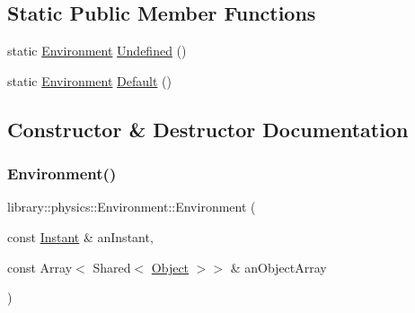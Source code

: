 \subsection*{Static Public Member Functions}
\begin{DoxyCompactItemize}
\item 
static \hyperlink{classlibrary_1_1physics_1_1_environment}{Environment} \hyperlink{classlibrary_1_1physics_1_1_environment_a8d1dfff3867d59ecdebd3ee6e98a2dab}{Undefined} ()
\item 
static \hyperlink{classlibrary_1_1physics_1_1_environment}{Environment} \hyperlink{classlibrary_1_1physics_1_1_environment_a7fcc57999bfb9c0c7e70b7cc783e30c8}{Default} ()
\end{DoxyCompactItemize}


\subsection{Constructor \& Destructor Documentation}
\mbox{\label{classlibrary_1_1physics_1_1_environment_a51854f130c31eb075ea623e332978495}} 
\subsubsection{\texorpdfstring{Environment()}{Environment()}\hspace{0.1cm}{\footnotesize\ttfamily [1/2]}}
{\footnotesize\ttfamily library\+::physics\+::\+Environment\+::\+Environment (\begin{DoxyParamCaption}\item[{const \hyperlink{classlibrary_1_1physics_1_1time_1_1_instant}{Instant} \&}]{an\+Instant,  }\item[{const Array$<$ Shared$<$ \hyperlink{classlibrary_1_1physics_1_1env_1_1_object}{Object} $>$$>$ \&}]{an\+Object\+Array }\end{DoxyParamCaption})}

\mbox{\label{classlibrary_1_1physics_1_1_environment_afb2fe03dcd7061a8ed5e155d7d134ba2}} 
